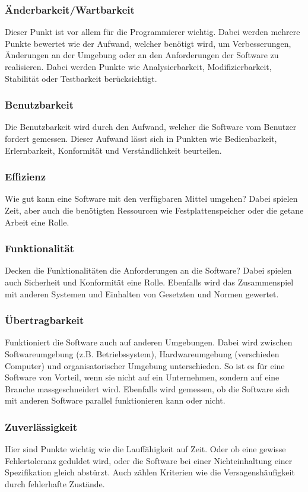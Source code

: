\subsubsection{Änderbarkeit/Wartbarkeit} 
Dieser Punkt ist vor allem für die Programmierer wichtig. Dabei werden mehrere Punkte bewertet wie der Aufwand, welcher benötigt wird, um Verbesserungen, Änderungen an der Umgebung oder an den Anforderungen der Software zu realisieren. Dabei werden Punkte wie Analysierbarkeit, Modifizierbarkeit, Stabilität oder Testbarkeit berücksichtigt.
\subsubsection{Benutzbarkeit}
Die Benutzbarkeit wird durch den Aufwand, welcher die Software vom Benutzer fordert gemessen. Dieser Aufwand lässt sich in Punkten wie Bedienbarkeit, Erlernbarkeit, Konformität und Verständlichkeit beurteilen.
\subsubsection{Effizienz}
Wie gut kann eine Software mit den verfügbaren Mittel umgehen? Dabei spielen Zeit, aber auch die benötigten Ressourcen wie Festplattenspeicher oder die getane Arbeit eine Rolle.
\subsubsection{Funktionalität} 
Decken die Funktionalitäten die Anforderungen an die Software? Dabei spielen auch Sicherheit und Konformität eine Rolle. Ebenfalls wird das Zusammenspiel mit anderen Systemen und Einhalten von Gesetzten und Normen gewertet.
\subsubsection{Übertragbarkeit} 
Funktioniert die Software auch auf anderen Umgebungen. Dabei wird zwischen Softwareumgebung (z.B. Betriebssystem), Hardwareumgebung (verschieden Computer) und organisatorischer Umgebung unterschieden. So ist es für eine Software von Vorteil, wenn sie nicht auf ein Unternehmen, sondern auf eine Branche massgeschneidert wird. Ebenfalls wird gemessen, ob die Software sich mit anderen Software parallel funktionieren kann oder nicht.
\subsubsection{Zuverlässigkeit} 
Hier sind Punkte wichtig wie die Lauffähigkeit auf Zeit. Oder ob eine gewisse Fehlertoleranz geduldet wird, oder die Software bei einer Nichteinhaltung einer Spezifikation gleich abstürzt. Auch zählen Kriterien wie die Versagenshäufigkeit durch fehlerhafte Zustände.
\cite{wiki:ISO}


